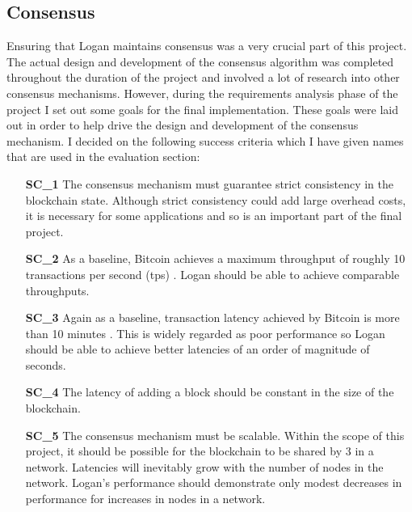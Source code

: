 \documentclass[12pt,a4paper,twoside,openright]{report}
\begin{document}
	\subsection{Consensus}\label{Consensus Requirements}
	Ensuring that Logan maintains consensus was a very crucial part of this project. 
	The actual design and development of the consensus algorithm was completed throughout the duration of the project and involved a lot of research into other consensus mechanisms.
	However, during the requirements analysis phase of the project I set out some goals for the final implementation.
	These goals were laid out in order to help drive the design and development of the consensus mechanism. 
	I decided on the following success criteria which I have given names that are used in the evaluation section:
	\begin{itemize}
		\setlength{\itemindent}{2em}
		\item[\textbf{SC\_1}]The consensus mechanism must guarantee strict consistency in the blockchain state. 
		Although strict consistency could add large overhead costs, it is necessary for some applications and so is an important part of the final project.
		\item[\textbf{SC\_2}] As a baseline, Bitcoin achieves a maximum throughput of roughly 10 transactions per second (tps) \parencite{ScalingBitcoin}.
		Logan should be able to achieve comparable throughputs.
		\item[\textbf{SC\_3}] Again as a baseline, transaction latency achieved by Bitcoin is more than 10 minutes \parencite{ScalingBitcoin}.
		This is widely regarded as poor performance so Logan should be able to achieve better latencies of an order of magnitude of seconds.
		\item[\textbf{SC\_4}] The latency of adding a block should be constant in the size of the blockchain.
		\item[\textbf{SC\_5}] The consensus mechanism must be scalable. 
		Within the scope of this project, it should be possible for the blockchain to be shared by 3 in a network. 
		Latencies will inevitably grow with the number of nodes in the network.
		Logan's performance should demonstrate only modest decreases in performance for increases in nodes in a network.
	\end{itemize}
\end{document}
